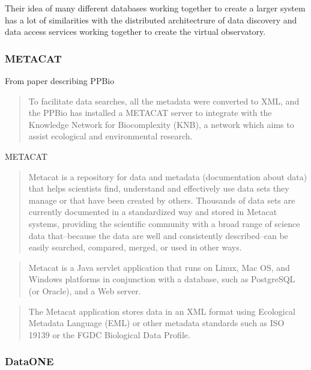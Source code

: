 \documentclass{article}
\begin{document}
Their idea of many different databases working together to create a larger
system has a lot of similarities with the distributed architectrure of data
discovery and data access services working together to create the virtual
observatory.

\subsubsection{METACAT}

From paper describing PPBio

\begin{quote}
To facilitate data searches, all the metadata were converted to XML, and the
PPBio has installed a METACAT server to integrate with the Knowledge Network for
Biocomplexity (KNB), a network which aims to assist ecological and environmental
research.
\end{quote}

METACAT

\begin{quote}
Metacat is a repository for data and metadata (documentation about data) that
helps scientists find, understand and effectively use data sets they manage or
that have been created by others. Thousands of data sets are currently
documented in a standardized way and stored in Metacat systems, providing the
scientific community with a broad range of science data that–because the data
are well and consistently described–can be easily searched, compared, merged, or
used in other ways.
\end{quote}
\begin{quote}
Metacat is a Java servlet application that runs on Linux, Mac OS, and Windows
platforms in conjunction with a database, such as PostgreSQL (or Oracle), and a
Web server.
\end{quote}
\begin{quote}
The Metacat application stores data in an XML format using Ecological Metadata
Language (EML) or other metadata standards such as ISO 19139 or the FGDC
Biological Data Profile.
\end{quote}

\subsubsection{DataONE}
\end{document}
